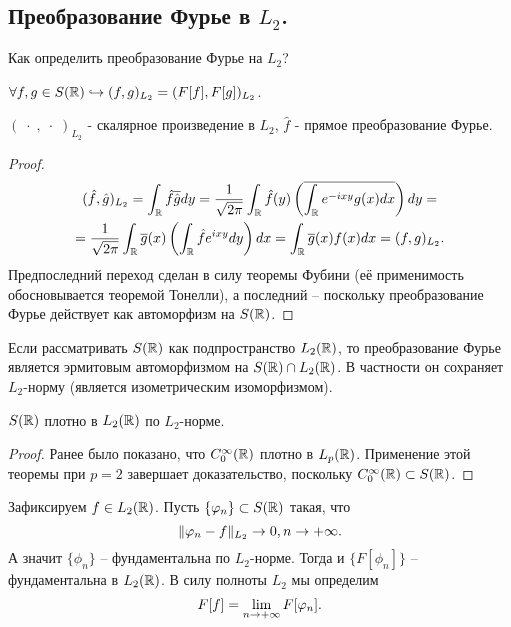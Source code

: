 \subsection{Преобразование Фурье в $L_2$.}
\begin{note}
    Как определить преобразование Фурье на $L_2$?
\end{note}
\begin{lemma}
    $\forall f, g \in S(\mathbb{R}) \hookrightarrow (f, g)_{L_2} = (F[f], F[g])_{L_2}$.
\end{lemma}
\begin{note}
    $(\;\cdot\;,\;\cdot\;)_{L_2}$ - скалярное произведение в $L_2$, $\hat{f}$ - прямое преобразование Фурье.
\end{note}
\begin{proof}
    \begin{multline*}
    (\hat{f}, \hat{g})_{L_2} = \int_{\mathbb{R}} \hat{f} \overline{\hat{g}}dy = \dfrac{1}{\sqrt {2\pi}} \int_{\mathbb{R}} \hat{f}(y) \left( \overline{\int_{\mathbb{R}} e^{-ixy}g(x)dx} \right)dy = \\ = \dfrac{1}{\sqrt {2\pi}} \int_{\mathbb{R}} \overline{g}(x) \left( \int_{\mathbb{R}} \hat{f}e^{ixy}dy \right) dx = \int_{\mathbb{R}} \overline{g}(x)f(x) dx = (f, g)_{L_2}.
    \end{multline*}
    Предпоследний переход сделан в силу теоремы Фубини (её применимость обосновывается теоремой Тонелли), а последний -- поскольку преобразование Фурье действует как автоморфизм на $S(\mathbb{R})$.
\end{proof}
\begin{corollary}
    Если рассматривать $S(\mathbb{R})$ как подпространство $L_2(\mathbb{R})$, то преобразование Фурье является эрмитовым автоморфизмом на $S(\mathbb{R}) \cap L_2(\mathbb{R})$.
    В частности он сохраняет $L_2$-норму (является изометрическим изоморфизмом).
\end{corollary}
\begin{lemma}
    $S(\mathbb{R})$ плотно в $L_2(\mathbb{R})$ по $L_2$-норме.
\end{lemma}
\begin{proof}
    Ранее было показано, что $C_0^{\infty}(\mathbb{R})$ плотно в $L_p(\mathbb{R})$.
    Применение этой теоремы при $p = 2$ завершает доказательство, поскольку $C_0^{\infty}(\mathbb{R}) \subset S(\mathbb{R})$.
\end{proof}
\begin{definition}
    Зафиксируем $f \in L_2(\mathbb{R})$.
    Пусть $\{\varphi_n\} \subset S(\mathbb{R})$ такая, что
    \[
        \|\varphi_n - f\|_{L_2} \rightarrow 0, n \rightarrow +\infty.
    \]
    А значит $\{\phi_n\}$ -- фундаментальна по $L_2$-норме.
    Тогда и $\{F[\phi_n]\}$ -- фундаментальна в $L_2(\mathbb{R})$.
    В силу полноты $L_2$ мы определим
    \[
        F[f] = \lim\limits_{n \rightarrow +\infty} F[\varphi_n].
    \]
\end{definition}

